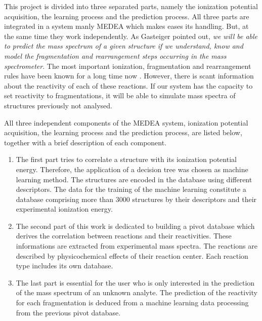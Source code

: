 \documentclass[10pt]{bmc_article}
\newenvironment{bmcformat}{\begin{raggedright}\baselineskip20pt\sloppy\setboolean{publ}{false}}{\end{raggedright}\baselineskip20pt\sloppy}
\begin{document}
\begin{bmcformat}
This project is divided into three separated parts, namely the ionization 
potential acquisition, the learning process and the prediction process. All 
three parts are integrated in a system manly MEDEA which makes eases its 
handling. But, at the same time they work independently. As Gasteiger pointed 
out, \emph{we will be able to predict the mass spectrum of a given structure if 
we understand, know and model the fragmentation and rearrangement steps 
occurring in the mass spectrometer}. The most  important ionization, 
fragmentation and rearrangement rules have been known for a long time now 
\cite{mcLafferty1980,budzikewicz1967}. However, there is scant information about the 
reactivity of each of these reactions. If our system has the capacity to set 
reactivity to fragmentations, it will be able to simulate mass spectra of 
structures previously not analysed.


All three independent components of the MEDEA system, ionization potential 
acquisition, the learning process and the prediction process, are listed below, 
together with a brief description of each component.
 
\begin{enumerate} \item The first part tries to correlate a 
structure with its ionization potential energy. Therefore, the application of a 
decision tree was chosen as machine learning method. The structures are encoded 
in the database using different descriptors. The data for the training of the 
machine learning constitute a database comprising more than 3000 structures by 
their descriptors and their experimental ionization energy.

\item The second part of this work is dedicated to building a pivot database 
which derives the correlation between reactions and their reactivities. These 
informations are extracted from experimental mass spectra. The reactions are 
described by physicochemical effects of their reaction center. Each reaction 
type includes its own database.

\item The last part is essential for the user who is only 
interested in the prediction of the mass spectrum of an unknown analyte. The 
prediction of the reactivity for each fragmentation is deduced from a machine 
learning data processing from the previous pivot database.
\end{enumerate}

 

\end{bmcformat}
\end{document}
